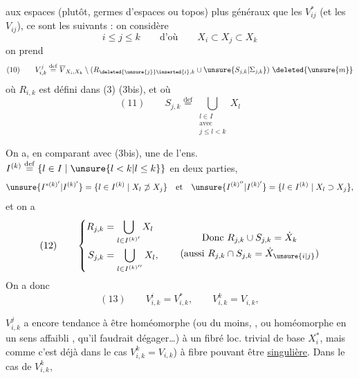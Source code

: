aux espaces (plutôt, germes d'espaces ou topos)  plus généraux que les $V_{ij}^*$ (et les $V_{ij}$), ce sont les suivants : on considère
\[
i\leq j\leq k\qquad\text{d'où}\qquad X_i\subset X_j\subset X_k
\]
on prend
\[
(10)\qquad V_{i,k}^j\overset{\mathrm{def}}=\overline V_{X_i,X_k}\setminus(R_{\deleted{\unsure{j}}\inserted{i},k}\cup\unsure{S_{j,k}|\Sigma_{j,k}})\ \deleted{\unsure{m}}
\]
où $R_{i,k}$ est défini dans (3) (3bis), et où
\[
(11)\qquad S_{j,k}\overset{\mathrm{def}}=\bigcup_{\substack{l\in I\\\text{avec}\\j\leq l<k}}X_l
\]

On a, en comparant avec (3bis), une   de l'ens. $I^{(k)}\overset{\mathrm{def}}=\{l\in I\mid\unsure{l<k|l\leq k}\}$ en deux parties,
\[
\unsure{I^{*(k)'}|I^{(k)'}}=\{l\in I^{(k)}\mid X_l\not\supset X_j\}\quad\text{et}\quad
\unsure{I^{(k)''}|I^{(k)'}}=\{l\in I^{(k)}\mid X_l\supset X_j\},
\]
et on a
\[
(12)\qquad\left\{\begin{aligned}
R_{j,k}&=\bigcup_{l\in I^{(k)'}}X_l\\
S_{j,k}&=\bigcup_{l\in I^{(k)''}}X_l,
\end{aligned}\right.
\qquad\begin{gathered}
\text{Donc }R_{j,k}\cup S_{j,k}=\dot X_k\\
(\text{aussi }R_{j,k}\cap S_{j,k}=\dot X_{\unsure{i|j}})
\end{gathered}
\]
 On a donc
\[
(13)\qquad V_{i,k}^i=V_{i,k}^*,\qquad V_{i,k}^k=V_{i,k},
\]

$V_{i,k}^j$ a encore tendance à être  homéomorphe (ou du moins, , ou homéomorphe en un sens affaibli , qu'il faudrait dégager\ldots) à un fibré loc. trivial de base $X_i^*$, mais comme c'est déjà dans le cas $V_{i,k}^k=V_{i,k}$) à fibre pouvant être \uline{singulière}. Dans le cas de $V_{i,k}^k$,
